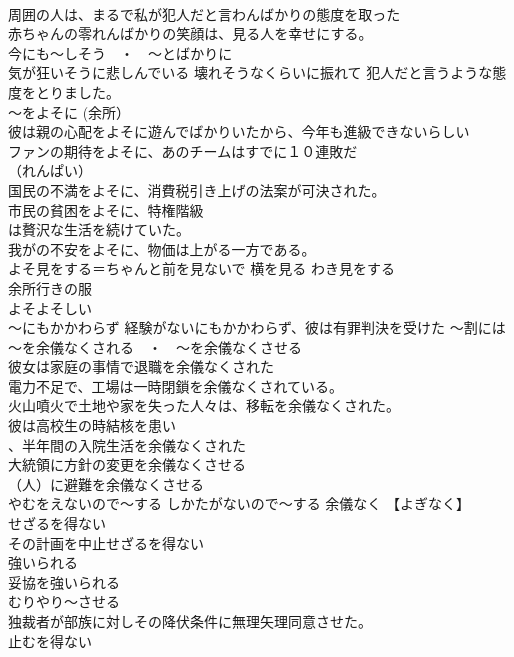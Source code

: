 \documentclass[8pt]{extreport}
\begin{document}
\begin{CJK}{UTF8}{min}
\\	周囲の人は、まるで私が犯人だと言わんばかりの態度を取った 
\\	赤ちゃんの零れんばかりの笑顔は、見る人を幸せにする。
\\	今にも～しそう　・　～とばかりに　
\\	気が狂いそうに悲しんでいる 壊れそうなくらいに振れて 犯人だと言うような態度をとりました。
\\	～をよそに (余所）	
\\	彼は親の心配をよそに遊んでばかりいたから、今年も進級できないらしい
\\	ファンの期待をよそに、あのチームはすでに１０連敗だ 
\\	（れんぱい） 
\\	国民の不満をよそに、消費税引き上げの法案が可決された。 
\\	市民の貧困をよそに、特権階級
\\	は贅沢な生活を続けていた。
\\	我がの不安をよそに、物価は上がる一方である。
\\	よそ見をする＝ちゃんと前を見ないで 横を見る わき見をする 
\\	余所行きの服 
\\	よそよそしい 
\\	～にもかかわらず 経験がないにもかかわらず、彼は有罪判決を受けた ～割には
\\	～を余儀なくされる　・　～を余儀なくさせる	
\\	彼女は家庭の事情で退職を余儀なくされた 
\\	電力不足で、工場は一時閉鎖を余儀なくされている。 
\\	火山噴火で土地や家を失った人々は、移転を余儀なくされた。 
\\	彼は高校生の時結核を患い
\\	、半年間の入院生活を余儀なくされた 
\\	大統領に方針の変更を余儀なくさせる 
\\	（人）に避難を余儀なくさせる 
\\	やむをえないので～する しかたがないので～する 余儀なく 【よぎなく】 
\\	せざるを得ない 
\\	その計画を中止せざるを得ない 
\\	強いられる 
\\	妥協を強いられる 
\\	むりやり～させる 
\\	独裁者が部族に対しその降伏条件に無理矢理同意させた。
\\	止むを得ない 

\end{CJK}
\end{document}
